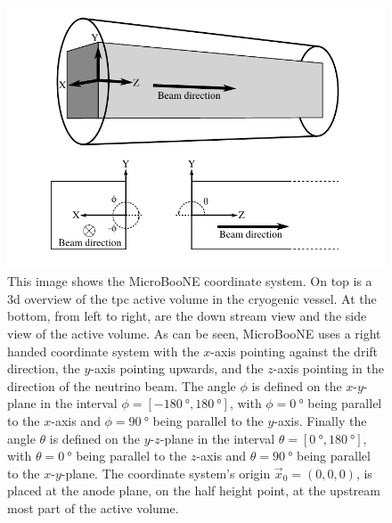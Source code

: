 \begin{figure}[htbp]
    \centering
    \includegraphics[width=\textwidth]{images/MicroBooNE/MicroBooNECoordinateSystem.pdf}
    \caption[MicroBooNE Coordinate System]{This image shows the MicroBooNE coordinate system. On top is a \gls{3d} overview of the \gls{tpc} active volume in the cryogenic vessel. At the bottom, from left to right, are the down stream view and the side view of the active volume. As can be seen, MicroBooNE uses a right handed coordinate system with the $x$-axis pointing against the drift direction, the $y$-axis pointing upwards, and the $z$-axis pointing in the direction of the neutrino beam. The angle $\phi$ is defined on the $x$-$y$-plane in the interval $\phi = [\SI{-180}{\degree},\SI{180}{\degree}]$, with $\phi = \SI{0}{\degree}$ being parallel to the $x$-axis and $\phi = \SI{90}{\degree}$ being parallel to the $y$-axis. Finally the angle $\theta$ is defined on the $y$-$z$-plane in the interval $\theta = [\SI{0}{\degree},\SI{180}{\degree}]$, with $\theta = \SI{0}{\degree}$ being parallel to the $z$-axis and $\theta = \SI{90}{\degree}$ being parallel to the $x$-$y$-plane. The coordinate system's origin $\vec{x}_0 = (0,0,0)$, is placed at the anode plane, on the half height point, at the upstream most part of the active volume.}
    \label{fig:MicroBooNECoordinateSystem}
\end{figure}

